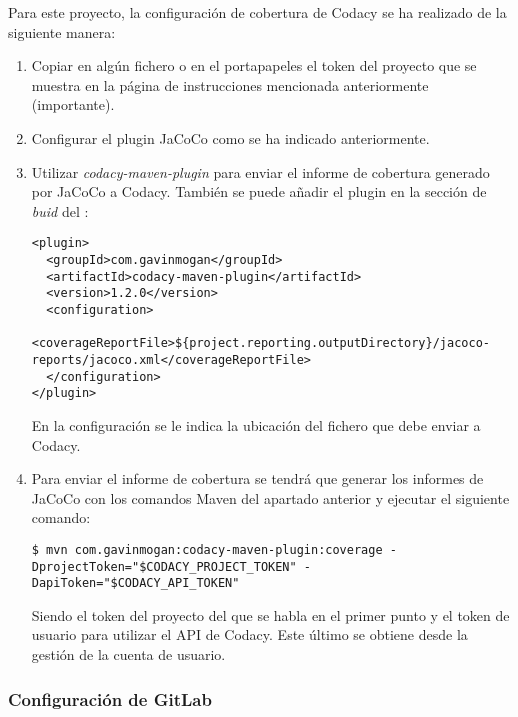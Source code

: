 Para este proyecto, la configuración de cobertura de Codacy se ha realizado de la siguiente manera:
\begin{enumerate}
	\item Copiar en algún fichero o en el portapapeles el token del proyecto que se muestra en la página de instrucciones mencionada anteriormente (importante).
	
	\item Configurar el plugin JaCoCo como se ha indicado anteriormente.
	
	\item Utilizar \textit{codacy-maven-plugin} para enviar el informe de cobertura generado por JaCoCo a Codacy. También se puede añadir el plugin en la sección de \textit{buid} del :\\
\begin{minipage}{\linewidth}
{\tiny
\begin{lstlisting}[breaklines]
<plugin>
  <groupId>com.gavinmogan</groupId>
  <artifactId>codacy-maven-plugin</artifactId>
  <version>1.2.0</version>
  <configuration>
	<coverageReportFile>${project.reporting.outputDirectory}/jacoco-reports/jacoco.xml</coverageReportFile>
  </configuration>
</plugin>
\end{lstlisting}
}
\end{minipage}
	En la configuración se le indica la ubicación del fichero que debe enviar a Codacy.

	\item Para enviar el informe de cobertura se tendrá que generar los informes de JaCoCo con los comandos Maven del apartado anterior y ejecutar el siguiente comando:\\
\begin{minipage}{\linewidth}
{\tiny
\begin{lstlisting}[breaklines]
$ mvn com.gavinmogan:codacy-maven-plugin:coverage -DprojectToken="$CODACY_PROJECT_TOKEN" -DapiToken="$CODACY_API_TOKEN"
\end{lstlisting}
}
\end{minipage}
	Siendo  el token del proyecto del que se habla en el primer punto y  el token de usuario para utilizar el API de Codacy. Este último se obtiene desde la gestión de la cuenta de usuario.
\end{enumerate}

\subsubsection{Configuración de GitLab}

